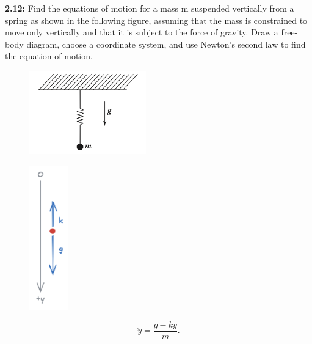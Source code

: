 \begin{homeworkProblem}

	\textbf{2.12:} Find the equations of motion for a mass m suspended vertically from a spring as shown in the following figure, assuming that the mass is constrained to move only vertically and that it is subject to the force of gravity. Draw a free-body diagram, choose a coordinate system, and use Newton’s second law to find the equation of motion.

	\begin{figure}[ht]
		\begin{center}
			\includegraphics[width=0.45\textwidth]{images/p7.png}
		\end{center}
	\end{figure}

	\solution

	\begin{figure}[ht]
		\begin{center}
			\includegraphics[width=0.15\textwidth]{images/s7.png}
		\end{center}
	\end{figure}

	\[
		\ddot{y} = \frac{g - ky}{m}
		.\]

\end{homeworkProblem}

